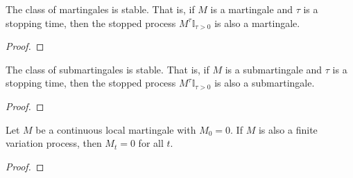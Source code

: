 \begin{lemma}\label{lem:stable_IsMartingale}
  \leanok
The class of martingales is stable. That is, if $M$ is a martingale and $\tau$ is a stopping time, then the stopped process $M^{\tau}\mathbb{I}_{\tau > 0}$ is also a martingale.
\end{lemma}

\begin{proof}

\end{proof}


\begin{lemma}\label{lem:stable_IsSubmartingale}
  \leanok
The class of submartingales is stable. That is, if $M$ is a submartingale and $\tau$ is a stopping time, then the stopped process $M^{\tau}\mathbb{I}_{\tau > 0}$ is also a submartingale.
\end{lemma}

\begin{proof}

\end{proof}


\begin{theorem}\label{thm:IsLocalMartingale.eq_zero_of_finiteVariation}
Let $M$ be a continuous local martingale with $M_0 = 0$. If $M$ is also a finite variation process, then $M_t = 0$ for all $t$.
\end{theorem}

\begin{proof}

\end{proof}
